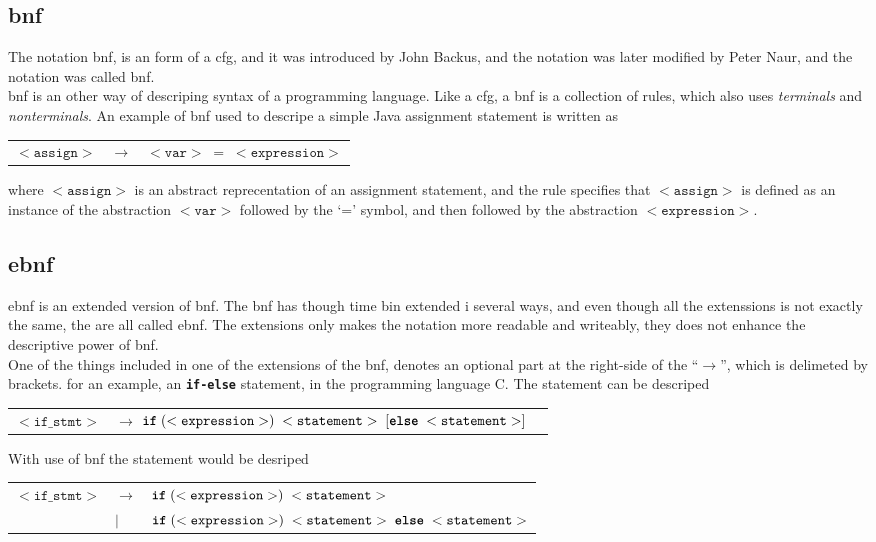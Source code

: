 \subsection{\ac{bnf}}
The notation \ac{bnf}, is an form of a \ac{cfg}, and it was introduced by John Backus, and the notation was later modified by Peter Naur, and the notation was called \ac{bnf}\cite{concepts_prog_lang}. \\
\ac{bnf} is an other way of descriping syntax of a programming language. Like a \ac{cfg}, a \ac{bnf} is a collection of rules, which also uses \textit{terminals} and \textit{nonterminals}. An example of \ac{bnf} used to descripe a simple Java assignment statement is written as

\begin{tabular}{l l l}
$<\texttt{assign}>$ & $\rightarrow$ & $<\texttt{var}> \; = \; <\texttt{expression}>$ 
\end{tabular}

where $<\texttt{assign}>$ is an abstract reprecentation of an assignment statement, and the rule specifies that $<\texttt{assign}>$ is defined as an instance of the abstraction $<\texttt{var}>$ followed by the `=' symbol, and then followed by the abstraction $<\texttt{expression}>$.

\subsection{\ac{ebnf}}
\ac{ebnf} is an extended version of \ac{bnf}. The \ac{bnf} has though time bin extended i several ways, and even though all the extenssions is not exactly the same, the are all called \ac{ebnf}. The extensions only makes the notation more readable and writeably, they does not enhance the descriptive power of \ac{bnf}. \\
One of the things included in one of the extensions of the \ac{bnf}, denotes an optional part at the right-side of the ``$\rightarrow$'', which is delimeted by brackets. for an example, an \textbf{\texttt{if-else}} statement, in the programming language C. The statement can be descriped

\begin{tabular}{l l l}
$< \texttt{if\_stmt}>$ & $\rightarrow$ $ \textbf{\texttt{if}} \; ( < \texttt{expression} > ) \;  < \texttt{statement} > \; [ \textbf{\texttt{else}} \; < \texttt{statement} > ]$
\end{tabular}

With use of \ac{bnf} the statement would be desriped \\

\begin{tabular}{l l l}
$< \texttt{if\_stmt}>$ & $\rightarrow$ &  $\textbf{\texttt{if}}  \; ( < \texttt{expression} > ) \;  < \texttt{statement} >$ \\
 & $|$ & $ \textbf{\texttt{if}} \; ( < \texttt{expression} > ) \;  < \texttt{statement} > \; \textbf{\texttt{else}} \; < \texttt{statement} > $
\end{tabular}
